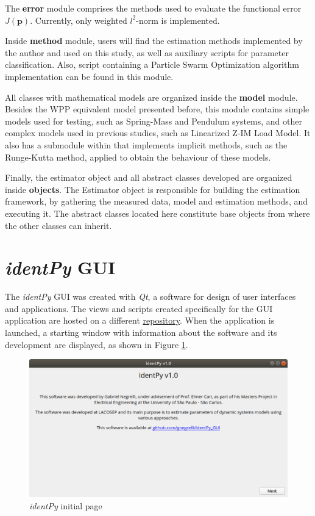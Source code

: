 The \textbf{error} module comprises the methods used to evaluate the functional error $J(\mathbf{p})$. Currently, only weighted $l^{2}$-norm is implemented.

Inside \textbf{method} module, users will find the estimation methods implemented by the author and used on this study, as well as auxiliary scripts for parameter classification. Also, script containing a Particle Swarm Optimization algorithm implementation can be found in this module.

All classes with mathematical models are organized inside the \textbf{model} module. Besides the WPP equivalent model presented before, this module contains simple models used for testing, such as Spring-Mass and Pendulum systems, and other complex models used in previous studies, such as Linearized Z-IM Load Model. It also has a submodule within that implements implicit methods, such as the Runge-Kutta method, applied to obtain the behaviour of these models.

Finally, the estimator object and all abstract classes developed are organized inside \textbf{objects}. The Estimator object is responsible for building the estimation framework, by gathering the measured data, model and estimation methods, and executing it. The abstract classes located here constitute base objects from where the other classes can inherit.

\section{\textit{identPy} GUI}

The \textit{identPy} GUI was created with \textit{Qt}, a software for design of user interfaces and applications. The views and scripts created specifically for the GUI application are hosted on a different \href{https://github.com/gnegrelli/identPy_GUI}{repository}. When the application is launched, a starting window with information about the software and its development are displayed, as shown in Figure \ref{fig: initial_page}.

\begin{figure}[!h]
	\caption{\textit{identPy} initial page}
	\begin{center}
		\includegraphics[scale=.5]{Images/Software_initial_page.eps}
	\end{center}
	\label{fig: initial_page}
\end{figure}

